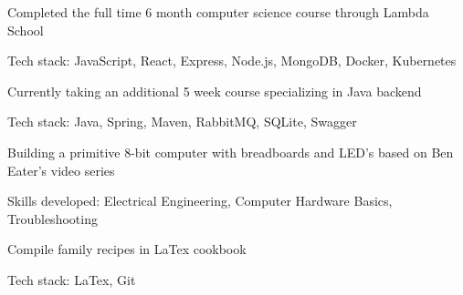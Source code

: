 \documentclass[letterpaper]{resume}
\begin{document}
\begin{compactitem}
\item Completed the full time 6 month computer science course through Lambda School
\item Tech stack: JavaScript, React, Express, Node.js, MongoDB, Docker, Kubernetes
\item Currently taking an additional 5 week course specializing in Java backend
\item Tech stack: Java, Spring, Maven, RabbitMQ, SQLite, Swagger
\end{compactitem}


\begin{compactitem}
\item Building a primitive 8-bit computer with breadboards and LED's based on Ben Eater's video series
\item Skills developed: Electrical Engineering, Computer Hardware Basics, Troubleshooting
\end{compactitem}

\begin{compactitem}
\item Compile family recipes in LaTex cookbook
\item Tech stack: LaTex, Git
\end{compactitem}
\end{document}
